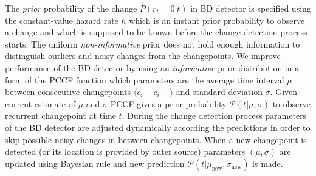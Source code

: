 The \textit{prior} probability of the change $P(r_t=0|t)$ in BD detector is specified using the constant-value hazard rate $h$ which is an instant prior probability to observe a change and which is supposed to be known before the change detection process starts.
The uniform \textit{non-informative} prior does not hold enough information to distinguish outliers and noisy changes from the changepoints.
%
We improve performance of the BD detector by using an \textit{informative} prior distribution in a form of the PCCF function which parameters are the average time interval $\mu$ between consecutive changepoints $\langle c_i - c_{i-1} \rangle$ and standard deviation $\sigma$.
Given current estimate of $\mu$ and $\sigma$ PCCF gives a prior probability $\mathcal{P}(t | \mu,\sigma)$ to observe recurrent changepoint at time $t$.
During the change detection process parameters of the BD detector are adjusted dynamically according the predictions in order to skip possible noisy changes in between changepoints.
When a new changepoint is detected  (or its location is provided by outer source) parameters $(\mu, \sigma)$ are updated using Bayesian rule and new prediction
$\mathcal{P}(t | \mu_{\text{new}}, \sigma_{\text{new}})$ is made.
%

